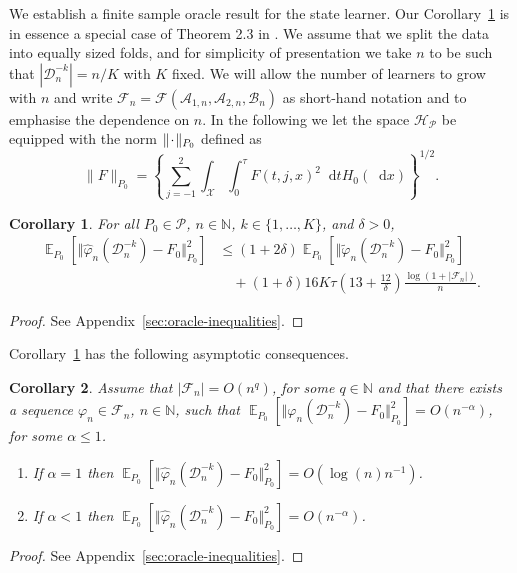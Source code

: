 \documentclass[11pt]{article}
\theoremstyle{thmstyleone}%
\newtheorem{corollary}{Corollary}
\theoremstyle{thmstyletwo}%
\theoremstyle{thmstylethree}%
\DeclareMathOperator{\E}{\mathbb{E}} %
\newcommand{\N}{\mathbb{N}}
\newcommand{\blank}{\makebox[1ex]{\textbf{$\cdot$}}}
\renewcommand{\phi}{\varphi}
\newcommand*\diff{\mathop{}\!\mathrm{d}}
\newcommand\bigO{\textit{O}}
\newcommand{\1}{\mathds{1}}
\newcommand{\data}{\ensuremath{\mathcal{D}}}
\begin{document}
We establish a finite sample oracle result for the state learner. Our
Corollary~\ref{cor:oracle-prop} is in essence a special case of
Theorem 2.3 in \citep{vaart2006oracle}.  We assume that we split the
data into equally sized folds, and for simplicity of presentation we
take \( n \) to be such that \( |\data_n^{-k}| = n/K \) with \( K \)
fixed. We will allow the number of learners to grow with \( n \) and
write
\( \mathcal{F}_n=\mathcal{F}(\mathcal{A}_{1,n}, \mathcal{A}_{2,n},
\mathcal{B}_n)\) as short-hand notation and to emphasise the
dependence on \( n \).
In the following we let the space \( \mathcal{H}_{\mathcal{P}} \) be equipped with the norm
\( \| \blank \|_{P_0} \) defined as
\begin{equation}
  \label{eq:norm}
  \| F \|_{P_0} = 
  \left\{
    \sum_{j=-1}^{2}\int_{\mathcal{X}} \int_0^{\tau} F(t, j, x)^2 \diff t H_0( \diff x)
  \right\}^{1/2}.
\end{equation}

\begin{corollary}
  \label{cor:oracle-prop}
  For all \(P_0\in\mathcal{P}\), \( n \in \N \), \( k \in \{1, \dots, K\} \),
  and $\delta>0$,
  \begin{align*}
    \E_{P_0}{\left[ \Vert \hat{\phi}_n(\data_n^{-k}) - F_0 \Vert_{P_0}^2 \right]}
    & \leq (1 + 2\delta)
      \E_{P_0}{\left[ \Vert \tilde{\phi}_n(\data_n^{-k}) - F_0 \Vert_{P_0}^2 \right]}
    \\
    & \quad
      + (1+ \delta) 16   K \tau
      \left(
      13 + \frac{12}{\delta}
      \right)
      \frac{\log(1 + |\mathcal{F}_n|)}{n}.
  \end{align*}
\end{corollary}
\begin{proof}
  See Appendix~\ref{sec:oracle-inequalities}.
\end{proof}

Corollary~\ref{cor:oracle-prop} has the following asymptotic consequences.

\begin{corollary}
  \label{cor:asymp-cons}
  Assume that \( |\mathcal{F}_n| = \bigO(n^q)\), for some \( q \in \N \) and
  that there exists a sequence \( \phi_n \in \mathcal{F}_n \), \( n \in \N \),
  such that
  \( \E_{P_0}{\left[ \Vert \phi_n(\data_n^{-k}) - F_{0} \Vert_{P_0}^2 \right]} =
  \bigO(n^{-\alpha}) \), for some \( \alpha\leq 1 \).
  \begin{enumerate}[label=(\alph*)]
  \item If $\alpha=1$ then
    \( \E_{P_0}{\left[ \Vert \hat{\phi}_n(\data_n^{-k}) - F_0 \Vert_{P_0}^2
      \right]} = \bigO(\log(n)n^{-1}) \).
  \item If $\alpha<1$ then
    \( \E_{P_0}{\left[ \Vert \hat{\phi}_n(\data_n^{-k}) - F_0 \Vert_{P_0}^2 \right]} =
    \bigO(n^{-\alpha}) \).
  \end{enumerate}
\end{corollary}
\begin{proof}
  See Appendix~\ref{sec:oracle-inequalities}.
\end{proof}
\end{document}
